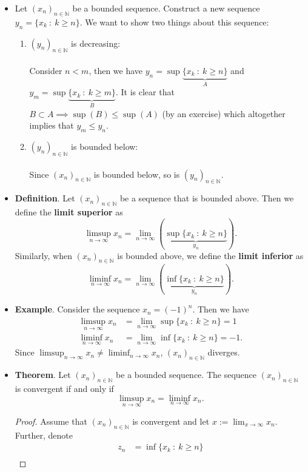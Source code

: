 \documentclass{article}
\newcommand{\N}{\mathbb{N}}
\newcommand{\seq}[2]{(#1_{#2})_{#2 \in \N}}
\newcommand{\mylim}[2]{\lim_{#1 \to #2}}
\newcommand{\mylimmm}[2]{\lim\limits_{#1 \to #2}}
\newcommand{\?}{\stackrel{?}{=}}
\begin{document}
\begin{itemize}
    \item Let $\seq{x}{n}$ be a bounded sequence. Construct a new sequence $y_n = \{x_k \ : \ k \geq n\}$. We want to show two things about this sequence:
    \begin{enumerate}[label=(\arabic*)]
        \item $\seq{y}{n}$ is decreasing: \\\\
        Consider $n < m$, then we have $y_n = \sup\underbrace{\{x_k \ : \ k \geq n\}}_{A}$ and $y_m = \sup\underbrace{\{x_k \ : \ k \geq m\}}_{B}$. It is clear that $B \subset A \implies \sup(B) \leq \sup(A)$ (by an exercise) which altogether implies that $y_m \leq y_n$.
        \item $\seq{y}{n}$ is bounded below: \\\\
        Since $\seq{x}{n}$ is bounded below, so is $\seq{y}{n}$.
    \end{enumerate}
    \item \textbf{Definition}. Let $\seq{x}{n}$ be a sequence that is bounded above. Then we define the \textbf{limit superior} as
    $$\limsup_{n \to \infty} x_n = \mylimmm{n}{\infty} \left(\underbrace{\sup\{x_k \ : \ k \geq n\}}_{y_n}\right).$$
    Similarly, when $\seq{x}{n}$ is bounded above, we define the \textbf{limit inferior} as
    $$\liminf_{n \to \infty} x_n = \mylimmm{n}{\infty} \left(\underbrace{\inf\{x_k \ : \ k \geq n\}}_{y_n}\right).$$
    \item \textbf{Example}. Consider the sequence $x_n = (-1)^n$. Then we have
    \begin{align*}
        \limsup_{n \to \infty} x_n &= \mylimmm{n}{\infty} \sup\{x_k \ : \ k \geq n\} = 1 \\
        \liminf_{n \to \infty} x_n &= \mylimmm{n}{\infty} \inf\{x_k \ : \ k \geq n\} = -1.
    \end{align*}
    Since $\limsup_{n \to \infty} x_n \neq \liminf_{n \to \infty} x_n$, $\seq{x}{n}$ diverges.
    \item \textbf{Theorem}. Let $\seq{x}{n}$ be a bounded sequence. The sequence $\seq{x}{n}$ is convergent if and only if
    $$\limsup_{n \to \infty} x_n = \liminf_{n \to \infty} x_n.$$
    \begin{proof}
        Assume that $\seq{x}{n}$ is convergent and let $x := \mylim{x}{\infty} x_n$. Further, denote
        \begin{align*}
            z_n &= \inf\{x_k \ : \ k \geq n\} \\

\end{align*}
\end{proof}
\end{itemize}
\end{document}
